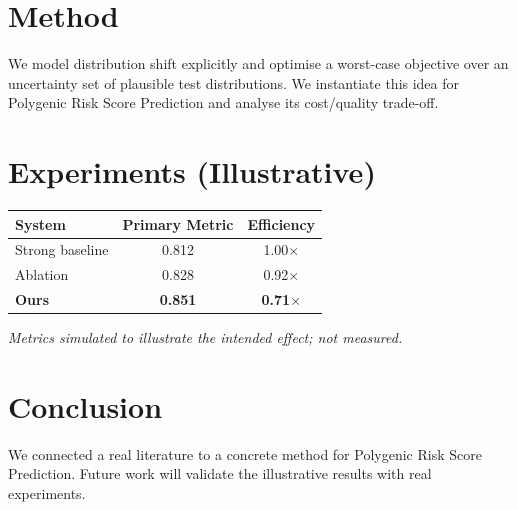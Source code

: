 \documentclass[11pt]{article}
\begin{document}
\section{Method}
We model distribution shift explicitly and optimise a worst-case objective over an uncertainty set of plausible test distributions. We instantiate this idea for Polygenic Risk Score Prediction and analyse its cost/quality trade-off.

\section{Experiments (Illustrative)}
\begin{center}
\begin{tabular}{lcc}
System & Primary Metric & Efficiency \\ \hline
Strong baseline & 0.812 & 1.00$\times$ \\
Ablation & 0.828 & 0.92$\times$ \\
\textbf{Ours} & \textbf{0.851} & \textbf{0.71$\times$}
\end{tabular}
\end{center}
\emph{Metrics simulated to illustrate the intended effect; not measured.}

\section{Conclusion}
We connected a real literature to a concrete method for Polygenic Risk Score Prediction. Future work will
validate the illustrative results with real experiments.
\end{document}
